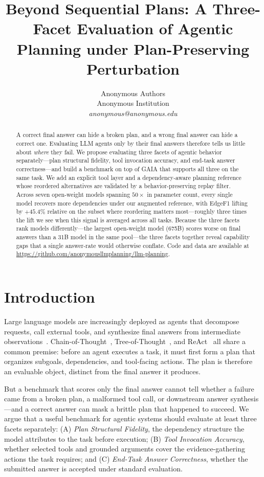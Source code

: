 \documentclass{article}
\title{Beyond Sequential Plans: A Three-Facet Evaluation of Agentic Planning under Plan-Preserving Perturbation}
\author{Anonymous Authors \\
Anonymous Institution \\
\emph{anonymous@anonymous.edu}}
\begin{document}
\maketitle
\begin{abstract}
A correct final answer can hide a broken plan, and a wrong final answer can hide a correct one.
Evaluating LLM agents only by their final answers therefore tells us little about \emph{where} they fail.
We propose evaluating three facets of agentic behavior separately---plan structural fidelity, tool invocation accuracy, and end-task answer correctness---and build a benchmark on top of GAIA that supports all three on the same task.
We add an explicit tool layer and a dependency-aware planning reference whose reordered alternatives are validated by a behavior-preserving replay filter.
Across seven open-weight models spanning $50\times$ in parameter count, every single model recovers more dependencies under our augmented reference, with EdgeF1 lifting by $+45.4\%$ relative on the subset where reordering matters most---roughly three times the lift we see when this signal is averaged across all tasks.
Because the three facets rank models differently---the largest open-weight model (675B) scores worse on final answers than a 31B model in the same pool---the three facets together reveal capability gaps that a single answer-rate would otherwise conflate.
Code and data are available at \url{https://github.com/anonymousllmplanning/llm-planning}.
\end{abstract}

\section{Introduction}
Large language models are increasingly deployed as agents that decompose requests, call external tools, and synthesize final answers from intermediate observations~\cite{10.1145/3586183.3606763,hong2024metagpt,shen2023hugginggpt}. 
Chain-of-Thought~\cite{CoT, gao-etal-2025-efficient}, Tree-of-Thought~\cite{yao2024tree, ni-etal-2025-tree}, and ReAct~\cite{yao2022react,shen2026thinking} all share a common premise: before an agent executes a task, it must first form a plan that organizes subgoals, dependencies, and tool-facing actions.
The plan is therefore an evaluable object, distinct from the final answer it produces.

But a benchmark that scores only the final answer cannot tell whether a failure came from a broken plan, a malformed tool call, or downstream answer synthesis---and a correct answer can mask a brittle plan that happened to succeed. 
We argue that a useful benchmark for agentic systems should evaluate at least three facets separately: (A) \emph{Plan Structural Fidelity},  the dependency structure the model attributes to the task before execution; (B) \emph{Tool Invocation Accuracy}, whether selected tools and grounded arguments cover the evidence-gathering actions the task requires; and (C) \emph{End-Task Answer Correctness}, whether the submitted answer is accepted under standard evaluation.
\end{document}
